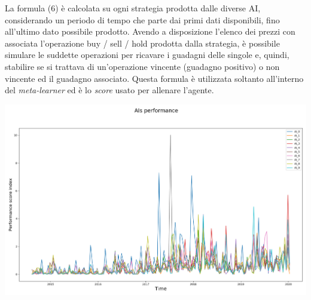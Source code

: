 \documentclass[a4paper,12pt]{report}
\begin{document}
La formula (6) è calcolata su ogni strategia prodotta dalle diverse AI, considerando un periodo di tempo che parte dai primi dati disponibili, fino all'ultimo dato possibile prodotto. Avendo a disposizione l'elenco dei prezzi con associata l'operazione buy / sell / hold prodotta dalla strategia, è possibile simulare le suddette operazioni per ricavare i guadagni delle singole e, quindi, stabilire se si trattava di un'operazione vincente (guadagno positivo) o non vincente ed il guadagno associato. Questa formula è utilizzata soltanto all'interno del \textit{meta-learner} ed è lo \textit{score} usato per allenare l'agente.
\begin{fig}
	\begin{center}
		\includegraphics[width=\linewidth]{performance_ai_250}
	\end{center}
	\label{Figura 13}
\end{fig}
\end{document}
